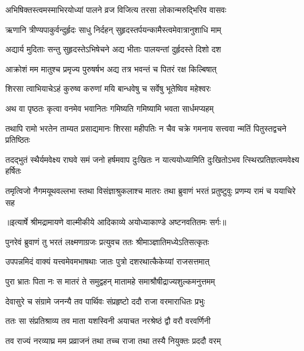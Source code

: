 \twolineshloka
{अभिषिक्तस्त्वमस्माभिरयोध्यां पालने व्रज}
{विजित्य तरसा लोकान्मरुद्भिरिव वासवः} %

\twolineshloka
{ऋणानि त्रीण्यपाकुर्वन्दुर्हृदः साधु निर्दहन्}
{सुहृदस्तर्पयन्कामैस्त्वमेवात्रानुशाधि माम्} %

\twolineshloka
{अद्यार्य मुदिताः सन्तु सुहृदस्तेऽभिषेचने}
{अद्य भीताः पालयन्तां दुर्हृदस्ते दिशो दश} %

\twolineshloka
{आक्रोशं मम मातुश्च प्रमृज्य पुरुषर्षभ}
{अद्य तत्र भवन्तं च पितरं रक्ष किल्बिषात्} %

\twolineshloka
{शिरसा त्वाभियाचेऽहं कुरुष्व करुणां मयि}
{बान्धवेषु च सर्वेषु भूतेष्विव महेश्वरः} %

\twolineshloka
{अथ वा पृष्ठतः कृत्वा वनमेव भवानितः}
{गमिष्यति गमिष्यामि भवता सार्धमप्यहम्} %

\fourlineindentedshloka
{तथापि रामो भरतेन ताम्यत}
{ प्रसाद्यमानः शिरसा महीपतिः}
{न चैव चक्रे गमनाय सत्त्ववा}
{न्मतिं पितुस्तद्वचने प्रतिष्ठितः} %

\fourlineindentedshloka
{तदद्भुतं स्थैर्यमवेक्ष्य राघवे}
{ समं जनो हर्षमवाप दुःखितः}
{न यात्ययोध्यामिति दुःखितोऽभव}
{त्स्थिरप्रतिज्ञत्वमवेक्ष्य हर्षितः} %

\fourlineindentedshloka
{तमृत्विजो नैगमयूथवल्लभा}
{स्तथा विसंज्ञाश्रुकलाश्च मातरः}
{तथा ब्रुवाणं भरतं प्रतुष्टुवुः}
{ प्रणम्य रामं च ययाचिरे सह} %


{॥इत्यार्षे श्रीमद्रामायणे वाल्मीकीये आदिकाव्ये अयोध्याकाण्डे अष्टनवतितमः सर्गः॥}


\twolineshloka
{पुनरेवं ब्रुवाणं तु भरतं लक्ष्मणाग्रजः}
{प्रत्युवच ततः श्रीमाञ्ज्ञातिमध्येऽतिसत्कृतः} %

\twolineshloka
{उपपन्नमिदं वाक्यं यत्त्वमेवमभाषथाः}
{जातः पुत्रो दशरथात्कैकेय्यां राजसत्तमात्} %

\twolineshloka
{पुरा भ्रातः पिता नः स मातरं ते समुद्वहन्}
{मातामहे समाश्रौषीद्राज्यशुल्कमनुत्तमम्} %

\twolineshloka
{देवासुरे च संग्रामे जनन्यै तव पार्थिवः}
{संप्रहृष्टो ददौ राजा वरमाराधितः प्रभुः} %

\twolineshloka
{ततः सा संप्रतिश्राव्य तव माता यशस्विनी}
{अयाचत नरश्रेष्ठं द्वौ वरौ वरवर्णिनी} %

\twolineshloka
{तव राज्यं नरव्याघ्र मम प्रव्राजनं तथा}
{तच्च राजा तथा तस्यै नियुक्तः प्रददौ वरम्} %

